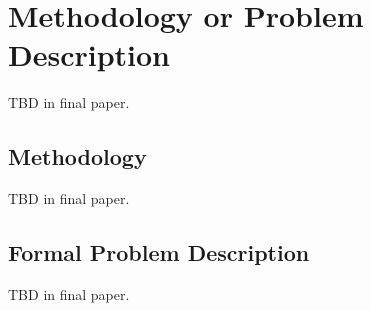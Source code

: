 \section{Methodology or Problem Description}
TBD in final paper.
\subsection{Methodology}
TBD in final paper.
\subsection{Formal Problem Description}
TBD in final paper.